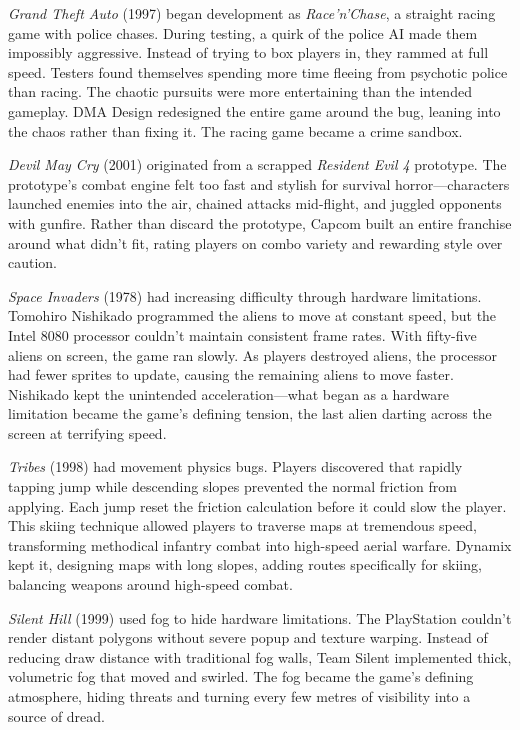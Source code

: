 \emph{Grand Theft Auto} (1997) began development as \emph{Race'n'Chase}, a straight racing game with police chases. During testing, a quirk of the police AI made them impossibly aggressive. Instead of trying to box players in, they rammed at full speed.  Testers found themselves spending more time fleeing from psychotic police than racing. The chaotic pursuits were more entertaining than the intended gameplay. DMA Design redesigned the entire game around the bug, leaning into the chaos rather than fixing it. The racing game became a crime sandbox.

\emph{Devil May Cry} (2001) originated from a scrapped \emph{Resident Evil 4} prototype. The prototype's combat engine felt too fast and stylish for survival horror—characters launched enemies into the air, chained attacks mid-flight, and juggled opponents with gunfire. Rather than discard the prototype, Capcom built an entire franchise around what didn't fit, rating players on combo variety and rewarding style over caution.

\emph{Space Invaders} (1978) had increasing difficulty through hardware limitations. Tomohiro Nishikado programmed the aliens to move at constant speed, but the Intel 8080 processor couldn't maintain consistent frame rates. With fifty-five aliens on screen, the game ran slowly. As players destroyed aliens, the processor had fewer sprites to update, causing the remaining aliens to move faster.  Nishikado kept the unintended acceleration—what began as a hardware limitation became the game's defining tension, the last alien darting across the screen at terrifying speed.

\emph{Tribes} (1998) had movement physics bugs. Players discovered that rapidly tapping jump while descending slopes prevented the normal friction from applying. Each jump reset the friction calculation before it could slow the player. This \QSOpen{}skiing\QSClose{} technique allowed players to traverse maps at tremendous speed, transforming methodical infantry combat into high-speed aerial warfare. Dynamix kept it, designing maps with long slopes, adding routes specifically for skiing, balancing weapons around high-speed combat.

\emph{Silent Hill} (1999) used fog to hide hardware limitations. The PlayStation couldn't render distant polygons without severe popup and texture warping. Instead of reducing draw distance with traditional fog walls, Team Silent implemented thick, volumetric fog that moved and swirled.  The fog became the game's defining atmosphere, hiding threats and turning every few metres of visibility into a source of dread.

